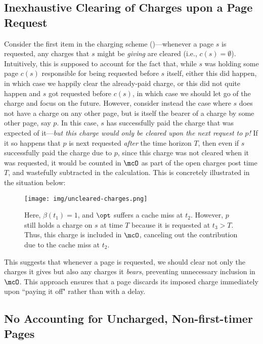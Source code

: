 \documentclass[11pt]{article}
\begin{document}
\subsection{Inexhaustive Clearing of Charges upon a Page Request}
\label{sec:looseness-uncleared-charges}

Consider the first item in the charging scheme ()---whenever a page $s$ is requested, any charges that $s$ might be \textit{giving} are cleared (i.e., $c(s)=\emptyset$). Intuitively, this is supposed to account for the fact that, while $s$ was holding some page $c(s)$ responsible for being requested before $s$ itself, either this did happen, in which case we happily clear the already-paid charge, or this did not quite happen and $s$ got requested before $c(s)$, in which case we should let go of the charge and focus on the future. However, consider instead the case where $s$ does not have a charge on any other page, but is itself the bearer of a charge by some other page, say $p$. In this case, $s$ has successfully paid the charge that was expected of it---\textit{but this charge would only be cleared upon the next request to $p$!} If it so happens that $p$ is next requested \textit{after} the time horizon $T$, then even if $s$ successfully paid the charge due to $p$, since this charge was not cleared when it was requested, it would be counted in $\mcO$ as part of the open charges post time $T$, and wastefully subtracted in the calculation. This is concretely illustrated in the situation below:
\begin{figure}[H]
    \centering
    \texttt{[image: img/uncleared-charges.png]}
    \caption{Here, $\beta(t_1)=1$, and $\opt$ suffers a cache miss at $t_2$. However, $p$ still holds a charge on $s$ at time $T$ because it is requested at $t_3 > T$. Thus, this charge is included in $\mcO$, canceling out the contribution due to the cache miss at $t_2$.}
    \label{fig:uncleared-charges}
\end{figure}
This suggests that whenever a page is requested, we should clear not only the charges it gives but also any charges it {\em bears}, preventing unnecessary inclusion in $\mcO$. This approach ensures that a page discards its imposed charge immediately upon ``paying it off" rather than with a delay.

\subsection{No Accounting for Uncharged, Non-first-timer Pages}
\label{sec:looseness-uncharged-non-first-time}
\end{document}
